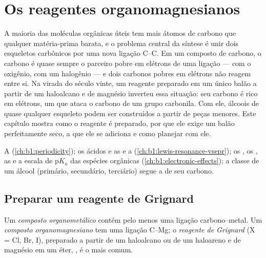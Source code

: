 \chapter{Os reagentes organomagnesianos}\label{ch:b1:organomagnesium}

A maioria das moléculas orgânicas úteis tem mais átomos de carbono que
qualquer matéria-prima barata, e o problema central da síntese é unir
dois esqueletos carbônicos por uma nova ligação C--C. Em um composto de
carbono, o carbono é quase sempre o parceiro pobre em elétrons de uma
ligação --- com o oxigênio, com um halogênio --- e dois carbonos pobres
em elétrons não reagem entre si. Na virada do século vinte, um reagente
preparado em um único balão a partir de um haloalcano e de magnésio
inverteu essa situação: seu carbono é rico em elétrons, um  que
ataca o carbono de um grupo carbonila. Com ele, álcoois de quase
qualquer esqueleto podem ser construídos a partir de peças menores. Este
capítulo mostra como o reagente é preparado, por que ele exige um balão
perfeitamente seco, a que ele se adiciona e como planejar com ele.

\begin{recall}
A  (\cref{ch:b1:periodicity}); os ácidos e as  e a  (\cref{ch:b1:lewis-resonance-vsepr}); os
, os , as  e a escala de
$\mathrm{p}K_a$ das espécies orgânicas (\cref{ch:b1:electronic-effects});
a classe de um álcool (primário, secundário, terciário) segue a de seu
carbono.
\end{recall}

\section{Preparar um reagente de Grignard}

\begin{definition}\label{def:b1:organomagnesium:organometallic}
Um \emph{composto organometálico} contém
pelo menos uma ligação carbono--metal. Um \emph{composto
organomagnesiano} tem uma ligação C--Mg; o
\emph{reagente de Grignard}  (X = Cl, Br, I),
preparado a partir de um haloalcano ou de um haloareno e de magnésio em
um éter, , é o mais comum.
\end{definition}

